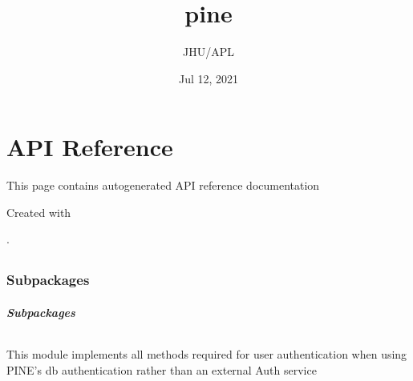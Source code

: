 \documentclass[letterpaper,10pt,english]{sphinxmanual}
\title{pine}
\date{Jul 12, 2021}
\author{JHU/APL}
\begin{document}
\pagestyle{empty}
\sphinxmaketitle
\pagestyle{plain}
\sphinxtableofcontents
\pagestyle{normal}
\label{\detokenize{index::doc}}



\chapter{API Reference}
\label{\detokenize{autoapi/index:api-reference}}\label{\detokenize{autoapi/index::doc}}
\sphinxAtStartPar
This page contains auto\sphinxhyphen{}generated API reference documentation %
\begin{footnote}[1]\sphinxAtStartFootnote
Created with 
%
\end{footnote}.


\section{}
\label{\detokenize{autoapi/pine/index:module-pine}}\label{\detokenize{autoapi/pine/index:pine}}\label{\detokenize{autoapi/pine/index::doc}}

\subsection{Subpackages}
\label{\detokenize{autoapi/pine/index:subpackages}}

\subsubsection{}
\label{\detokenize{autoapi/pine/backend/index:module-pine.backend}}\label{\detokenize{autoapi/pine/backend/index:pine-backend}}\label{\detokenize{autoapi/pine/backend/index::doc}}

\paragraph{Subpackages}
\label{\detokenize{autoapi/pine/backend/index:subpackages}}

\subparagraph{}
\label{\detokenize{autoapi/pine/backend/admin/index:module-pine.backend.admin}}\label{\detokenize{autoapi/pine/backend/admin/index:pine-backend-admin}}\label{\detokenize{autoapi/pine/backend/admin/index::doc}}
\sphinxAtStartPar
This module implements all methods required for user authentication when using PINE’s db authentication rather than
an external Auth service
\end{document}
